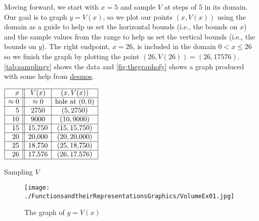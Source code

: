 \begin{ex}
\begin{enumerate}
Moving forward, we start with $x = 5$ and sample $V$ at steps of $5$ in its domain.  Our goal is to graph $y = V(x)$, so we plot our points $(x, V(x))$  using  the domain as a guide to help us set the horizontal bounds (i.e., the bounds on $x$) and the sample values from the range to help us set the vertical bounds (i.e., the bounds on $y$).   The right endpoint, $x = 26$, is included in the domain $0 < x \leq 26$ so we finish the graph by plotting the point $(26, V(26)) = (26,17576)$. \autoref{tab:samplingv} shows the data and \autoref{fig:thegraphofy} shows a graph produced with some help from \href{https://www.desmos.com/}{\underline{desmos}}.
  
\begin{table}
\begin{center}
  
$\begin{array}{|r||c|c|}  \hline

  x & V(x) & (x,V(x)) \\ \hline
  
\approx 0 & \approx 0  & \text{hole at $(0,0)$} \\  \hline
 5 & 2750 & (5, 2750) \\  \hline
 10 & 9000 & (10, 9000) \\  \hline
 15 & 15, \! 750 & ( 15, 15, \! 750) \\  \hline
  20 & 20, \! 000 & ( 20 , 20, \! 000) \\  \hline
  25 & 18, \! 750 & ( 25, 18, \! 750) \\  \hline
  26 & 17, \! 576 &  (26,17, \! 576) \\ \hline
\end{array}$

\caption{Sampling $V$}
\label{tab:samplingv}
\end{center}
\end{table}

\begin{figure}
\begin{center}
  
\texttt{[image: ./FunctionsandtheirRepresentationsGraphics/VolumeEx01.jpg]}  \\

\caption{The graph of $y = V(x)$}
\label{fig:thegraphofy}
\end{center}
\end{figure}



\end{enumerate}
\end{ex}
